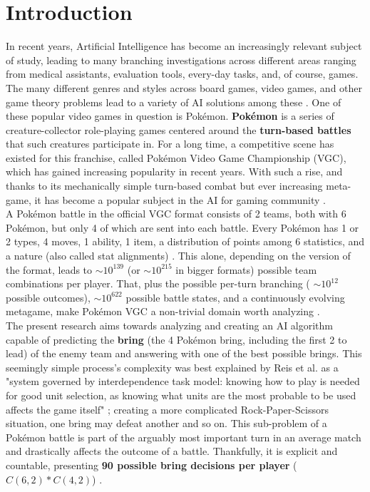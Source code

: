 \documentclass[conference]{IEEEtran}
\begin{document}
\section{Introduction}
In recent years, Artificial Intelligence has become an increasingly relevant subject of study, leading to many branching investigations across different areas ranging from medical assistants, evaluation tools, every-day tasks, and, of course, games. The many different genres and styles across board games, video games, and other game theory problems lead to a variety of AI solutions among these \cite{hu2024}. One of these popular video games in question is Pokémon. \textbf{Pokémon} is a series of creature-collector role-playing games centered around the \textbf{turn-based battles} that such creatures participate in. For a long time, a competitive scene has existed for this franchise, called Pokémon Video Game Championship (VGC), which has gained increasing popularity in recent years. With such a rise, and thanks to its mechanically simple turn-based combat but ever increasing meta-game, it has become a popular subject in the AI for gaming community \cite{hu2024}. \\

A Pokémon battle in the official VGC format consists of 2 teams, both with 6 Pokémon, but only 4 of which are sent into each battle.  Every Pokémon has 1 or 2 types, 4 moves, 1 ability, 1 item, a distribution of points among 6 statistics, and a nature (also called stat alignments) \cite{vgchandbook}. This alone, depending on the version of the format, leads to $\sim10^{139}$ (or $\sim10^{215}$ in bigger formats) \cite{karten2026} possible team combinations per player. That, plus the possible per-turn branching ( $\sim10^{12}$ possible outcomes),  $\sim10^{622}$ possible battle states, and a continuously evolving metagame, make Pokémon VGC a non-trivial domain worth analyzing \cite{angliss2026,karten2026} .\\ 

The present research aims towards analyzing and creating an AI algorithm capable of predicting the \textbf{bring} (the 4 Pokémon bring, including the first 2 to lead) of the enemy team and answering with one of the best possible brings. This seemingly simple process's complexity was best explained by Reis et al. as a "system governed by interdependence task model: knowing how to play is needed for good unit selection, as knowing what units are the most probable to be used affects the game itself" \cite{reis2021}; creating a more complicated Rock-Paper-Scissors situation, one bring may defeat another and so on. This sub-problem of a Pokémon battle is part of the arguably most important turn in an average match and drastically affects the outcome of a battle. Thankfully, it is explicit and countable, presenting \textbf{90 possible bring decisions per player} ($C(6,2) * C(4,2)$) \cite{angliss2026}.\\
\end{document}
